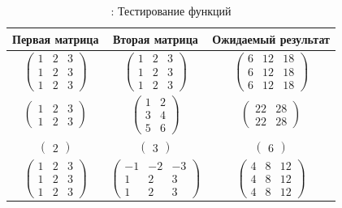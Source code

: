 \documentclass[12pt]{report}
\begin{document}
	\begin{table}[h!]
		\begin{center}
			\caption{\label{tbl:test}: Тестирование функций}
			\begin{tabular}{|c|c|c|}
				\hline
				Первая матрица & Вторая матрица & Ожидаемый результат \\ 
				\hline
			$\begin{pmatrix}
			1 & 2 & 3\\
			1 & 2 & 3\\
			1 & 2 & 3
			\end{pmatrix}$ &
			$\begin{pmatrix}
			1 & 2 & 3\\
			1 & 2 & 3\\
			1 & 2 & 3
			\end{pmatrix}$ &
			$\begin{pmatrix}
			6 & 12 & 18\\
			6 & 12 & 18\\
			6 & 12 & 18
			\end{pmatrix}$ \\\hline
			$\begin{pmatrix}
			1 & 2 & 3\\
			1 & 2 & 3
			\end{pmatrix}$ &
			$\begin{pmatrix}
			1 & 2\\
			3 & 4\\
			5 & 6
			\end{pmatrix}$ &
			$\begin{pmatrix}
			22 & 28\\
			22 & 28
			\end{pmatrix}$ \\\hline
			$\begin{pmatrix}
			2
			\end{pmatrix}$ &
			$\begin{pmatrix}
			3
			\end{pmatrix}$ &
			$\begin{pmatrix}
			6
			\end{pmatrix}$ \\\hline
			$\begin{pmatrix}
			1 & 2 & 3\\
			1 & 2 & 3\\
			1 & 2 & 3
			\end{pmatrix}$ &
			$\begin{pmatrix}
			-1 & -2 & -3\\
			1 & 2 & 3\\
			1 & 2 & 3
			\end{pmatrix}$ &
			$\begin{pmatrix}
			4 & 8 & 12\\
			4 & 8 & 12\\
			4 & 8 & 12
			\end{pmatrix}$\\\hline
			\end{tabular}			
		\end{center}
	\end{table}
\end{document}
